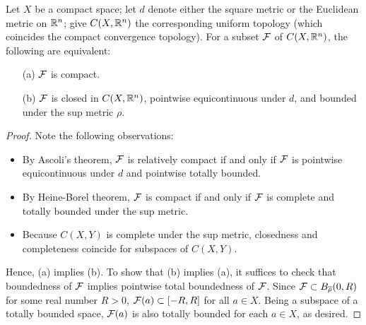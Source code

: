 \begin{cor}
    Let $X$ be a compact space; let $d$ denote either the square metric or the Euclidean metric on ${\mathbb{R}}^n$; give $C(X, {\mathbb{R}}^n)$ the corresponding uniform topology (which coincides the compact convergence topology).
    For a subset ${\mathcal{F}}$ of $C(X, {\mathbb{R}}^n)$, the following are equivalent:
    \begin{enumerate}
        \item[(a)]
        {
            ${\mathcal{F}}$ is compact.
        }
        \item[(b)]
        {
            ${\mathcal{F}}$ is closed in $C(X, {\mathbb{R}}^n)$, pointwise equicontinuous under $d$, and bounded under the sup metric $\rho$.
        }
    \end{enumerate}
\end{cor}
\begin{proof}
    Note the following observations:
    \begin{itemize}
        \item
        {
            By Ascoli's theorem, ${\mathcal{F}}$ is relatively compact if and only if ${\mathcal{F}}$ is pointwise equicontinuous under $d$ and pointwise totally bounded.
        }
        \item
        {
            By Heine-Borel theorem, ${\mathcal{F}}$ is compact if and only if ${\mathcal{F}}$ is complete and totally bounded under the sup metric.
        }
        \item
        {
            Because $C(X, Y)$ is complete under the sup metric, closedness and completeness coincide for subspaces of $C(X, Y)$.
        }
    \end{itemize}
    Hence, (a) implies (b).
    To show that (b) implies (a), it suffices to check that boundedness of ${\mathcal{F}}$ implies pointwise total boundedness of ${\mathcal{F}}$.
    Since ${\mathcal{F}}\subset B_{\overline{\rho}}(0, R)$ for some real number $R>0$, ${\mathcal{F}}(a)\subset[-R, R]$ for all $a\in X$.
    Being a subspace of a totally bounded space, ${\mathcal{F}}(a)$ is also totally bounded for each $a\in X$, as desired.
\end{proof}

